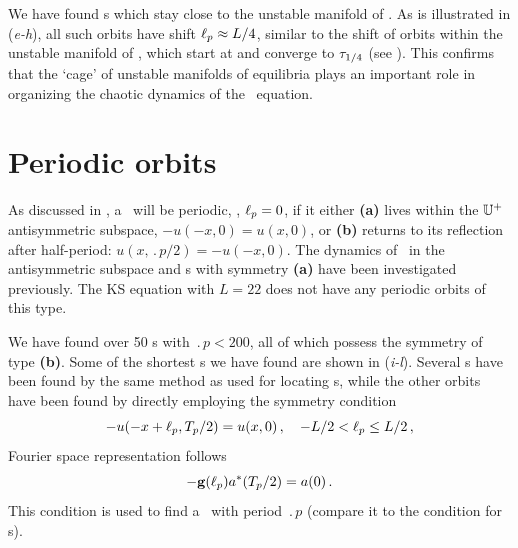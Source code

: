 


We have found \rpo s which stay
close to the unstable manifold of .
As is illustrated in (\textit{e-h}), all such orbits have
shift $\ell_p \approx L/4$, similar to the shift of orbits within
the unstable manifold of , which start at  and
converge to $\tau_{1/4}$ (see ). This
confirms that the `cage' of unstable manifolds of equilibria plays
an important role in organizing the chaotic dynamics of the \KS\
equation.


\section{Periodic orbits} \label{ssec:po}
As discussed in , a \rpo\ will be periodic, \ie,
$\ell_p = 0$, if it either {\bf (a)} lives within the $\mathbb{U}^+$ antisymmetric
subspace, $-u(-x,0) = u(x,0)$, or {\bf (b)} returns to its reflection
after half-period: $u(x,\period{p}/2)=-u(-x,0)$.  The dynamics of
\KSe\ in the antisymmetric subspace and \po s with symmetry {\bf (a)} have
been investigated
previously. The KS equation
with $L = 22$ does not have any periodic orbits of this type.


We have found over 50 \po s with $\period{p} < 200$, 
all of which possess the symmetry
of type {\bf (b)}. %
Some of the shortest \po s we have found are shown in
(\textit{i-l}).  Several \po s have been found by the same
method as used for locating \rpo s, while the other orbits have been
found by directly employing the symmetry condition 
\[ -u(-x+\ell_p,{T_{p}}/2) = u(x,0)\,, \quad -L/2 < \ell_p \leq L/2\,,\]
\PCedit{or, equivalently, in the } Fourier space representation
follows
\[ -\mathbf{g}(\ell_p)a^\ast({T_{p}}/2) = a(0)\,. \]
This condition is used to find a \po\ with period $\period{p}$
(compare it to the condition  for \rpo s).


